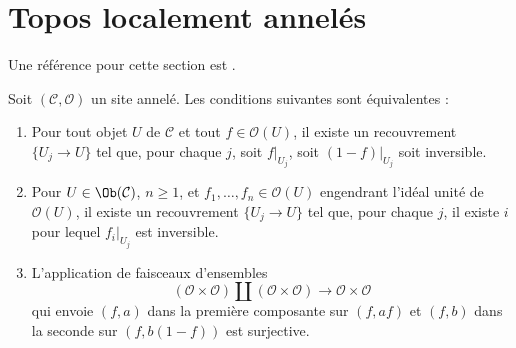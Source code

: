 \section{Topos localement annelés}
\label{section-locally-ringed}


\noindent
Une référence pour cette section est
\cite[Expos\'e IV, Exercice 13.9]{SGA4}.

\begin{lemma}
\label{lemma-locally-ringed}
Soit $(\mathcal{C}, \mathcal{O})$ un site annelé. Les conditions suivantes
sont équivalentes :
\begin{enumerate}
\item Pour tout objet $U$ de $\mathcal{C}$ et tout $f \in \mathcal{O}(U)$,
il existe un recouvrement $\{U_j \to U\}$ tel que, pour chaque $j$, soit
$f|_{U_j}$, soit $(1 - f)|_{U_j}$ soit inversible.
\item Pour $U \in \Ob(\mathcal{C})$, $n \geq 1$, et
$f_1, \ldots, f_n \in \mathcal{O}(U)$ engendrant l'idéal unité de
$\mathcal{O}(U)$, il existe un recouvrement $\{U_j \to U\}$ tel que, pour
chaque $j$, il existe $i$ pour lequel $f_i|_{U_j}$ est inversible.
\item L'application de faisceaux d'ensembles
$$
(\mathcal{O} \times \mathcal{O})
\amalg
(\mathcal{O} \times \mathcal{O})
\longrightarrow
\mathcal{O} \times \mathcal{O}
$$
qui envoie $(f, a)$ dans la première composante sur $(f, af)$ et $(f, b)$ dans
la seconde sur $(f, b(1 - f))$ est surjective.
\end{enumerate}
\end{lemma}

